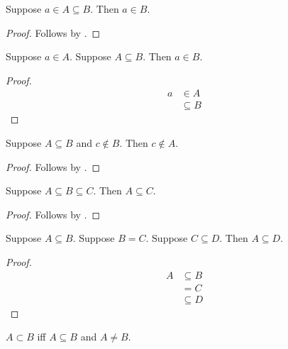 \begin{composition}%
\label{elem_subseteq}
    Suppose $a\in A\subseteq B$.
    Then $a\in B$.
\end{composition}
\begin{proof}
    Follows by .
\end{proof}

\begin{proposition}\label{elem_subseteq_calculation}
    Suppose $a\in A$.
    Suppose $A\subseteq B$.
    Then $a\in B$.
\end{proposition}
\begin{proof}
    \begin{align*}
        a
            &\in A
                \\
            &\subseteq B
    \end{align*}
\end{proof}

\begin{proposition}%
\label{not_in_subseteq}
    Suppose $A\subseteq B$ and $c\notin B$.
    Then $c\notin A$.
\end{proposition}
\begin{proof}
    Follows by .
\end{proof}

\begin{composition}%
\label{subseteq_transitive}
    Suppose $A\subseteq B\subseteq C$.
    Then $A\subseteq C$.
\end{composition}
\begin{proof}
    Follows by .
\end{proof}

\begin{proposition}\label{subseteq_calculation}
    Suppose $A\subseteq B$.
    Suppose $B=C$.
    Suppose $C\subseteq D$.
    Then $A\subseteq D$.
\end{proposition}
\begin{proof}
    \begin{align*}
        A
            &\subseteq B
                \\
            &= C
                \\
            &\subseteq D
    \end{align*}
\end{proof}

\begin{definition}\label{subset}
    $A\subset B$ iff
    $A\subseteq B$ and $A\neq B$.
\end{definition}

